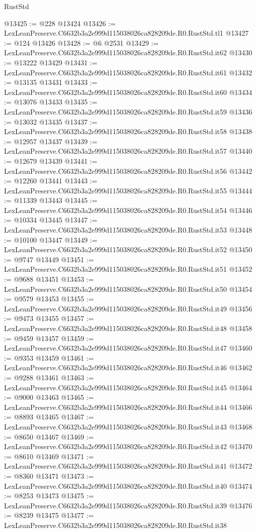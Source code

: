 \begin{lexlean}{RustStd}
\begin{coremodule}
@13425 := @228 @13424
@13426 := LexLeanPreserve.C6632b3a2e999d115038026ca828209de.R0.RustStd.tl1
@13427 := @124 @13426
@13428 := @6 @2531
@13429 := LexLeanPreserve.C6632b3a2e999d115038026ca828209de.R0.RustStd.it62
@13430 := @13222 @13429
@13431 := LexLeanPreserve.C6632b3a2e999d115038026ca828209de.R0.RustStd.it61
@13432 := @13135 @13431
@13433 := LexLeanPreserve.C6632b3a2e999d115038026ca828209de.R0.RustStd.it60
@13434 := @13076 @13433
@13435 := LexLeanPreserve.C6632b3a2e999d115038026ca828209de.R0.RustStd.it59
@13436 := @13032 @13435
@13437 := LexLeanPreserve.C6632b3a2e999d115038026ca828209de.R0.RustStd.it58
@13438 := @12957 @13437
@13439 := LexLeanPreserve.C6632b3a2e999d115038026ca828209de.R0.RustStd.it57
@13440 := @12679 @13439
@13441 := LexLeanPreserve.C6632b3a2e999d115038026ca828209de.R0.RustStd.it56
@13442 := @12260 @13441
@13443 := LexLeanPreserve.C6632b3a2e999d115038026ca828209de.R0.RustStd.it55
@13444 := @11339 @13443
@13445 := LexLeanPreserve.C6632b3a2e999d115038026ca828209de.R0.RustStd.it54
@13446 := @10334 @13445
@13447 := LexLeanPreserve.C6632b3a2e999d115038026ca828209de.R0.RustStd.it53
@13448 := @10100 @13447
@13449 := LexLeanPreserve.C6632b3a2e999d115038026ca828209de.R0.RustStd.it52
@13450 := @9747 @13449
@13451 := LexLeanPreserve.C6632b3a2e999d115038026ca828209de.R0.RustStd.it51
@13452 := @9688 @13451
@13453 := LexLeanPreserve.C6632b3a2e999d115038026ca828209de.R0.RustStd.it50
@13454 := @9579 @13453
@13455 := LexLeanPreserve.C6632b3a2e999d115038026ca828209de.R0.RustStd.it49
@13456 := @9473 @13455
@13457 := LexLeanPreserve.C6632b3a2e999d115038026ca828209de.R0.RustStd.it48
@13458 := @9459 @13457
@13459 := LexLeanPreserve.C6632b3a2e999d115038026ca828209de.R0.RustStd.it47
@13460 := @9353 @13459
@13461 := LexLeanPreserve.C6632b3a2e999d115038026ca828209de.R0.RustStd.it46
@13462 := @9288 @13461
@13463 := LexLeanPreserve.C6632b3a2e999d115038026ca828209de.R0.RustStd.it45
@13464 := @9000 @13463
@13465 := LexLeanPreserve.C6632b3a2e999d115038026ca828209de.R0.RustStd.it44
@13466 := @8893 @13465
@13467 := LexLeanPreserve.C6632b3a2e999d115038026ca828209de.R0.RustStd.it43
@13468 := @8650 @13467
@13469 := LexLeanPreserve.C6632b3a2e999d115038026ca828209de.R0.RustStd.it42
@13470 := @8610 @13469
@13471 := LexLeanPreserve.C6632b3a2e999d115038026ca828209de.R0.RustStd.it41
@13472 := @8360 @13471
@13473 := LexLeanPreserve.C6632b3a2e999d115038026ca828209de.R0.RustStd.it40
@13474 := @8253 @13473
@13475 := LexLeanPreserve.C6632b3a2e999d115038026ca828209de.R0.RustStd.it39
@13476 := @8239 @13475
@13477 := LexLeanPreserve.C6632b3a2e999d115038026ca828209de.R0.RustStd.it38

\end{coremodule}
\end{lexlean}
